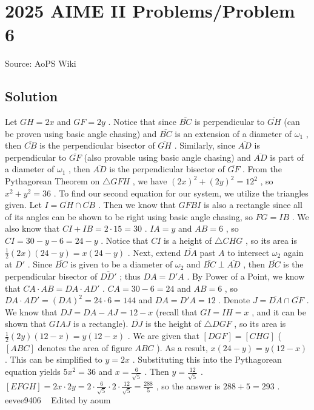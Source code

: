 \documentclass[12pt]{article}
\begin{document}
\section*{{2025 AIME II Problems/Problem 6}}
Source: AoPS Wiki

\subsection*{Solution}
Let $GH=2x$ and $GF=2y$ . Notice that since $\overline{BC}$ is perpendicular to $\overline{GH}$ (can be proven using basic angle chasing) and $\overline{BC}$ is an extension of a diameter of $\omega_1$ , then $\overline{CB}$ is the perpendicular bisector of $\overline{GH}$ . Similarly, since $\overline{AD}$ is perpendicular to $\overline{GF}$ (also provable using basic angle chasing) and $\overline{AD}$ is part of a diameter of $\omega_1$ , then $\overline{AD}$ is the perpendicular bisector of $\overline{GF}$ . From the Pythagorean Theorem on $\triangle GFH$ , we have $(2x)^2+(2y)^2=12^2$ , so $x^2+y^2=36$ . To find our second equation for our system, we utilize the triangles given. Let $I=\overline{GH}\cap\overline{CB}$ . Then we know that $GFBI$ is also a rectangle since all of its angles can be shown to be right using basic angle chasing, so $FG=IB$ . We also know that $CI+IB=2\cdot 15=30$ . $IA=y$ and $AB=6$ , so $CI=30-y-6=24-y$ . Notice that $CI$ is a height of $\triangle CHG$ , so its area is $\frac{1}{2}(2x)(24-y)=x(24-y)$ . Next, extend $\overline{DA}$ past $A$ to intersect $\omega_2$ again at $D'$ . Since $\overline{BC}$ is given to be a diameter of $\omega_2$ and $\overline{BC}\perp\overline{AD}$ , then $\overline{BC}$ is the perpendicular bisector of $\overline{DD'}$ ; thus $DA=D'A$ . By Power of a Point, we know that $CA\cdot AB=DA\cdot AD'$ . $CA=30-6=24$ and $AB=6$ , so $DA\cdot AD'=(DA)^2=24\cdot6=144$ and $DA=D'A=12$ . Denote $J=\overline{DA}\cap\overline{GF}$ . We know that $DJ=DA-AJ=12-x$ (recall that $GI=IH=x$ , and it can be shown that $GIAJ$ is a rectangle). $\overline{DJ}$ is the height of $\triangle DGF$ , so its area is $\frac{1}{2}(2y)(12-x)=y(12-x)$ . We are given that $[DGF]=[CHG]$ ( $[ABC]$ denotes the area of figure $ABC$ ). As a result, $x(24-y)=y(12-x)$ . This can be simplified to $y=2x$ . Substituting this into the Pythagorean equation yields $5x^2=36$ and $x=\frac{6}{\sqrt{5}}$ . Then $y=\frac{12}{\sqrt{5}}$ . $[EFGH]=2x\cdot2y=2\cdot\frac{6}{\sqrt{5}}\cdot2\cdot\frac{12}{\sqrt{5}}=\frac{288}{5}$ , so the answer is $288+5=\boxed{293}$ . ~ eevee9406 ~ Edited by aoum
\end{document}
